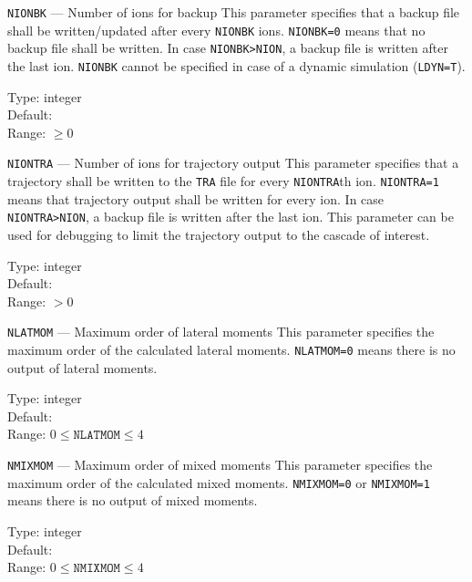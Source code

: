 \begin{keydescription}{\texttt{NIONBK} --- Number of ions for backup}
	This parameter specifies that a backup file shall be written/updated after every 
	\texttt{NIONBK} ions. \texttt{NIONBK=0} means that no backup file shall be written. In 
	case \texttt{NIONBK>NION}, a backup file is written after the last ion. \texttt{NIONBK} 
	cannot be specified in case of a dynamic simulation (\texttt{LDYN=T}).
	\begin{keytab}
		Type:    \> integer \\
		Default:   \\
		Range:   \> $\ge 0$
	\end{keytab}
\end{keydescription}

\begin{keydescription}{\texttt{NIONTRA} --- Number of ions for trajectory output}
	This parameter specifies that a trajectory shall be written to the \texttt{TRA} file for 
	every \texttt{NIONTRA}th ion. \texttt{NIONTRA=1} means that trajectory output shall be 
	written	for every ion. In case \texttt{NIONTRA>NION}, a backup file is written after the 
	last ion. This parameter can be used for debugging to limit the trajectory output to the 
	cascade of interest.
\begin{keytab}
	Type:    \> integer \\
	Default:   \\
	Range:   \> $> 0$
\end{keytab}
\end{keydescription}

\begin{keydescription}{\texttt{NLATMOM} --- Maximum order of lateral moments}
%
  This parameter specifies the maximum order of the calculated lateral moments.
  \texttt{NLATMOM=0} means there is no output of lateral moments. 
  \begin{keytab}
    Type:    \> integer \\
    Default:  \\
    Range:   \> $0 \le \texttt{NLATMOM} \le 4$
  \end{keytab}
\end{keydescription}

\begin{keydescription}{\texttt{NMIXMOM} --- Maximum order of mixed moments}
%
  This parameter specifies the maximum order of the calculated mixed moments.
  \texttt{NMIXMOM=0} or \texttt{NMIXMOM=1} means there is no output of mixed moments. 
  \begin{keytab}
    Type:    \> integer \\
    Default:  \\
    Range:   \> $0 \le \texttt{NMIXMOM} \le 4$
  \end{keytab}
\end{keydescription}

